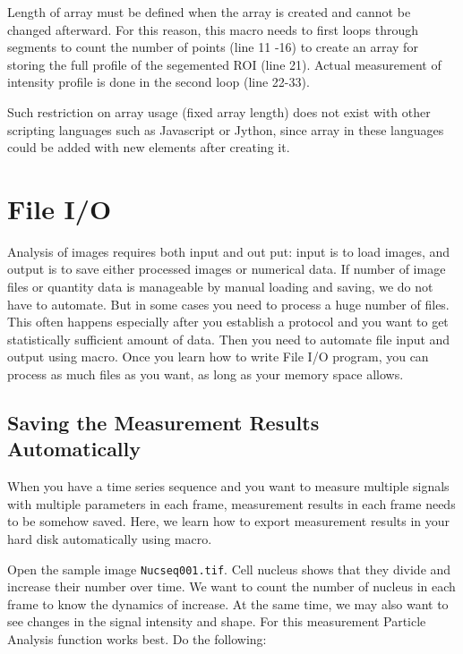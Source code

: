 \documentclass[11pt,a4paper,oneside]{report}
\newcommand{\ilcom}[1]{\texttt{\small#1}}
\begin{document}
Length of array must be defined when the array is created and cannot be changed afterward. 
For this reason, this macro needs to first loops through segments to count the number of points (line 11 -16) to create an array for storing the full profile of the segemented ROI (line 21). Actual measurement of intensity profile is done in the second loop (line 22-33).

Such restriction on array usage (fixed array length) does not exist with other scripting languages 
such as Javascript or Jython, since array in these languages could be added with new elements after 
creating it. 

\newpage

\section{File I/O}

Analysis of images requires both input and out put: input is to load images, 
and output is  to save either processed images or numerical data. 
If number of image files or quantity data is manageable by manual loading and saving, 
we do not have to automate. But in some cases you need to process a huge number of files. 
This often happens especially after you establish a protocol and you want to get 
statistically sufficient amount of data. Then you need to automate file input and output using macro. 
Once you learn how to write File I/O program, you can process as much files as you want, 
as long as your memory space allows.

\subsection{Saving the Measurement Results Automatically}

When you have a time series sequence and you want to measure multiple signals with 
multiple parameters in each frame, measurement results in each frame needs to be somehow saved. 
Here, we learn how to export measurement results in your hard disk automatically using macro. 

Open the sample image \ilcom{Nucseq001.tif}. Cell nucleus shows that they divide and 
increase their number over time. We want to count the number of nucleus in each frame to know 
the dynamics of increase. 
At the same time, we may also want to see changes in the signal intensity and shape. 
For this measurement Particle Analysis function works best. Do the following:
\end{document}
